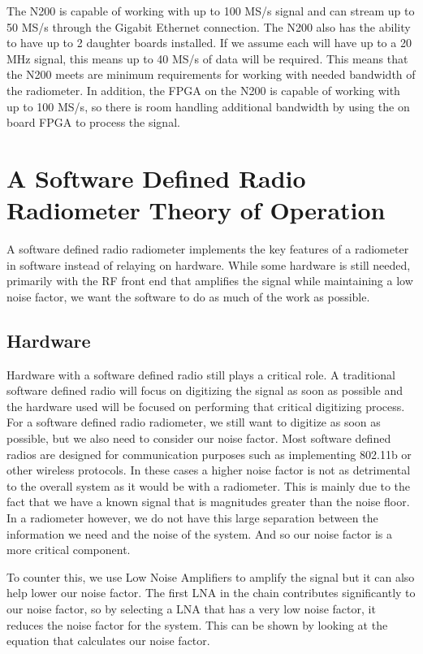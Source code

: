 The N200 is capable of working with up to 100 MS/s signal and can stream up to 50 MS/s through the Gigabit Ethernet connection.  The N200 also has the ability to have up to 2 daughter boards installed.  If we assume each will have up to a 20 MHz signal, this means up to 40 MS/s of data will be required.  This means that the N200 meets are minimum requirements for working with needed bandwidth of the radiometer.  In addition, the FPGA on the N200 is capable of working with up to 100 MS/s, so there is room handling additional bandwidth by using the on board FPGA to process the signal.

\section{A Software Defined Radio Radiometer Theory of Operation}
A software defined radio radiometer implements the key features of a radiometer in software instead of relaying on hardware.  While some hardware is still needed, primarily with the RF front end that amplifies the signal while maintaining a low noise factor, we want the software to do as much of the work as possible.  

\subsection{Hardware}

Hardware with a software defined radio still plays a critical role.  A traditional software defined radio will focus on digitizing the signal as soon as possible and the hardware used will be focused on performing that critical digitizing process.  For a software defined radio radiometer, we still want to digitize as soon as possible, but we also need to consider our noise factor.  Most software defined radios are designed for communication purposes such as implementing 802.11b or other wireless protocols.  In these cases a higher noise factor is not as detrimental to the overall system as it would be with a radiometer.  This is mainly due to the fact that we have a known signal that is magnitudes greater than the noise floor.  In a radiometer however, we do not have this large separation between the information we need and the noise of the system.  And so our noise factor is a more critical component.  

To counter this, we use Low Noise Amplifiers to amplify the signal but it can also help lower our noise factor.  The first LNA in the chain contributes significantly to our noise factor, so by selecting a LNA that has a very low noise factor, it reduces the noise factor for the system.  This can be shown by looking at the equation that calculates our noise factor.

